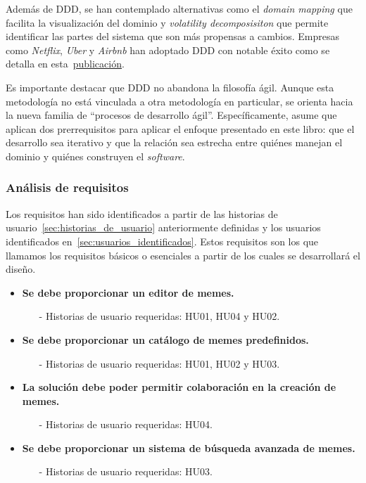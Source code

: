 Además de DDD, se han contemplado alternativas como el \textit{domain mapping} que facilita la visualización del dominio y \textit{volatility decomposisiton} que permite identificar las partes del sistema que son más propensas a cambios. Empresas como \textit{Netflix}, \textit{Uber} y \textit{Airbnb} han adoptado DDD con notable éxito como se detalla en esta~\href{https://blog.bitsrc.io demystifying-domain-driven-design-ddd-in-modern-software-architecture-b57e27c210f7}{publicación}.

Es importante destacar que DDD no abandona la filosofía ágil. Aunque esta metodología no está vinculada a otra metodología en particular, se orienta hacia la nueva familia de ``procesos de desarrollo ágil''. Específicamente, asume que aplican dos prerrequisitos para aplicar el enfoque presentado en este libro: que el desarrollo sea iterativo y que la relación sea estrecha entre quiénes manejan el dominio y quiénes construyen el \textit{software}.

\subsubsection{Análisis de requisitos}

Los requisitos han sido identificados a partir de las historias de usuario~\ref{sec:historias_de_usuario} anteriormente definidas y los usuarios identificados en~\ref{sec:usuarios_identificados}. Estos requisitos son los que llamamos los requisitos básicos o esenciales a partir de los cuales se desarrollará el diseño.

\begin{itemize}
    \item \textbf{Se debe proporcionar un editor de memes.}
          \begin{itemize}
              \item[-] Historias de usuario requeridas: HU01, HU04 y HU02.
          \end{itemize}
    \item \textbf{Se debe proporcionar un catálogo de memes predefinidos.}
          \begin{itemize}
              \item[-] Historias de usuario requeridas: HU01, HU02 y HU03.
          \end{itemize}
    \item \textbf{La solución debe poder permitir colaboración en la creación de memes.}
          \begin{itemize}
              \item[-] Historias de usuario requeridas: HU04.
          \end{itemize}
    \item \textbf{Se debe proporcionar un sistema de búsqueda avanzada de memes.}
          \begin{itemize}
              \item[-] Historias de usuario requeridas: HU03.
          \end{itemize}
\end{itemize}

